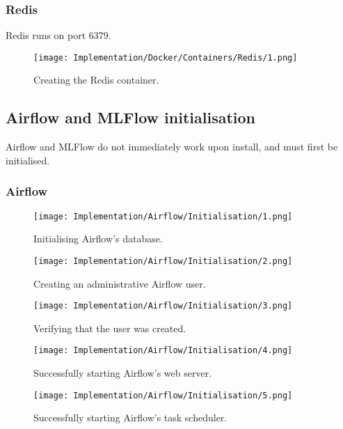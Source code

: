 \pagebreak 
\subsubsection{Redis}
Redis runs on port 6379.

\begin{figure}[H]
    \centering
    \texttt{[image: Implementation/Docker/Containers/Redis/1.png]}
    \caption{Creating the Redis container.}
    \label{fig:CreateRedis}
\end{figure}


\subsection{Airflow and MLFlow initialisation}
Airflow and MLFlow do not immediately work upon install, and must first be initialised.

\subsubsection{Airflow}
\begin{figure}[H]
    \centering
    \texttt{[image: Implementation/Airflow/Initialisation/1.png]}
    \caption{Initialising Airflow's database.}
    \label{fig:AirflowInit}
\end{figure}

\begin{figure}[H]
    \centering
    \texttt{[image: Implementation/Airflow/Initialisation/2.png]}
    \caption{Creating an administrative Airflow user.}
    \label{fig:AirflowUser1}
\end{figure}

\begin{figure}[H]
    \centering
    \texttt{[image: Implementation/Airflow/Initialisation/3.png]}
    \caption{Verifying that the user was created.}
    \label{fig:AirflowUser2}
\end{figure}

\begin{figure}[H]
    \centering
    \texttt{[image: Implementation/Airflow/Initialisation/4.png]}
    \caption{Successfully starting Airflow's web server.}
    \label{fig:AirflowWebserver}
\end{figure}

\begin{figure}[H]
    \centering
    \texttt{[image: Implementation/Airflow/Initialisation/5.png]}
    \caption{Successfully starting Airflow's task scheduler.}
    \label{fig:AirflowScheduler}
\end{figure}

